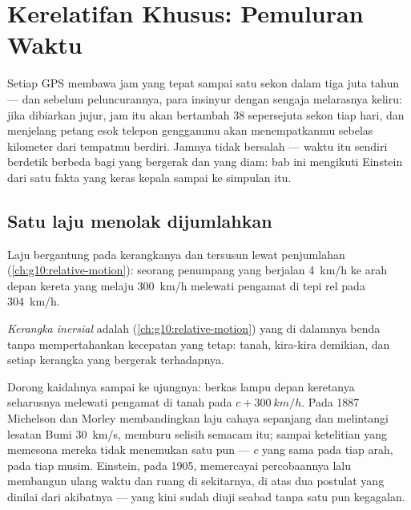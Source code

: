 \chapter{Kerelatifan Khusus: Pemuluran Waktu}\label{ch:g12:special-relativity}

Setiap  GPS membawa jam  yang tepat sampai satu sekon dalam tiga
juta tahun --- dan sebelum peluncurannya, para insinyur dengan sengaja melarasnya keliru:
jika dibiarkan jujur, jam itu akan bertambah 38 sepersejuta sekon tiap hari, dan menjelang petang
esok telepon genggammu akan menempatkanmu sebelas kilometer dari tempatmu berdiri.
Jamnya tidak bersalah --- waktu itu sendiri berdetik berbeda bagi yang bergerak dan
yang diam: bab ini mengikuti Einstein dari satu fakta yang keras kepala sampai ke simpulan itu.

\section{Satu laju menolak dijumlahkan}

Laju bergantung pada kerangkanya dan tersusun lewat penjumlahan
(\cref{ch:g10:relative-motion}): seorang penumpang yang berjalan \qty{4}{km/h} ke arah
depan kereta yang melaju \qty{300}{km/h} melewati pengamat di tepi rel pada \qty{304}{km/h}.

\begin{definition}\label{def:g12:special-relativity:inertial}
\emph{Kerangka inersial} adalah 
(\cref{ch:g10:relative-motion}) yang di dalamnya benda tanpa  mempertahankan
kecepatan yang tetap: tanah, kira-kira demikian, dan setiap kerangka yang bergerak
 terhadapnya.
\end{definition}

Dorong kaidahnya sampai ke ujungnya: berkas lampu depan keretanya seharusnya melewati
pengamat di tanah pada $c + \qty{300}{km/h}$. Pada 1887 Michelson dan Morley
membandingkan laju cahaya sepanjang dan melintangi lesatan  Bumi \qty{30}{km/s},
memburu selisih semacam itu; sampai ketelitian yang memesona mereka tidak menemukan
satu pun --- $c$ yang sama pada tiap arah, pada tiap musim. Einstein, pada 1905,
memercayai percobaannya lalu membangun ulang waktu dan ruang di sekitarnya, di atas dua postulat
yang dinilai dari akibatnya --- yang kini sudah diuji seabad tanpa satu pun kegagalan.

